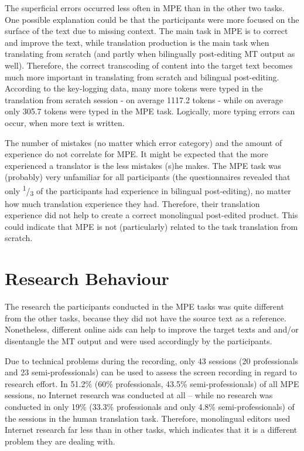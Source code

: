 \documentclass[output=paper]{langsci/langscibook}
\begin{document}
The superficial errors occurred less often in MPE than in the other two tasks. One possible explanation could be that the participants were more focused on the surface of the text due to missing context. The main task in MPE is to correct and improve the text, while translation production is the main task when translating from scratch (and partly when bilingually post-editing MT output as well). Therefore, the correct transcoding of content into the target text becomes much more important in translating from scratch and bilingual post-editing. According to the key-logging data, many more tokens were typed in the translation from scratch session - on average 1117.2 tokens - while on average only 305.7 tokens were typed in the MPE task. Logically, more typing errors can occur, when more text is written.



The number of mistakes (no matter which error category) and the amount of experience do not correlate for MPE. It might be expected that the more experienced a translator is the less mistakes (s)he makes. The MPE task was (probably) very unfamiliar for all participants (the questionnaires revealed that only \textsuperscript{1}/\textsubscript{3 }of the participants had experience in bilingual post-editing), no matter how much translation experience they had. Therefore, their translation experience did not help to create a correct monolingual post-edited product. This could indicate that MPE is not (particularly) related to the task translation from scratch.


\section[Research Behaviour]{Research Behaviour}

The research the participants conducted in the MPE tasks was quite different from the other tasks, because they did not have the source text as a reference. Nonetheless, different online aids can help to improve the target texts and and/or disentangle the MT output and were used accordingly by the participants.


Due to technical problems during the recording, only 43 sessions (20 professionals and 23 semi-professionals) can be used to assess the screen recording in regard to research effort. In 51.2\% (60\% professionals, 43.5\% semi-professionals) of all MPE sessions, no Internet research was conducted at all – while no research was conducted in only 19\% (33.3\% professionals and only 4.8\% semi-professionals) of the sessions in the human translation task. Therefore, monolingual editors used Internet research far less than in other tasks, which indicates that it is a different problem they are dealing with.
\end{document}
